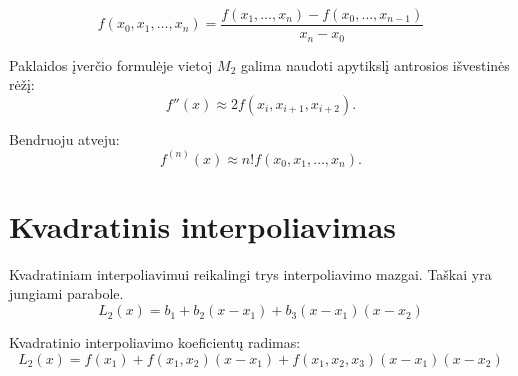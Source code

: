 \begin{defn}
  \begin{equation*}
    f(x_{0},x_{1},\ldots,x_{n})
      = \frac{f(x_{1},\ldots,x_{n})-f(x_{0},\ldots,x_{n-1})}{x_{n}-x_{0}}
  \end{equation*}
\end{defn}



Paklaidos įverčio formulėje vietoj $M_{2}$ galima naudoti apytikslį antrosios
išvestinės rėžį:
\begin{equation*}
  f''(x) \approx 2f(x_{i}, x_{i+1}, x_{i+2}).
\end{equation*}

Bendruoju atveju:
\begin{equation*}
  f^{(n)}(x) \approx n!f(x_{0},x_{1},\ldots,x_{n}).
\end{equation*}

\section{Kvadratinis interpoliavimas}

\cite[165-167]{textbook}


Kvadratiniam interpoliavimui reikalingi trys interpoliavimo mazgai.
Taškai yra jungiami parabole.
\begin{equation*}
  L_{2}(x) = b_{1} + b_{2}(x-x_{1}) + b_{3}(x-x_{1})(x - x_{2})
\end{equation*}



Kvadratinio interpoliavimo koeficientų radimas:
\begin{equation*}
  L_{2}(x)
    = f(x_{1})
    + f(x_{1},x_{2})(x-x_{1})
    + f(x_{1},x_{2},x_{3})(x-x_{1})(x-x_{2})
\end{equation*}


